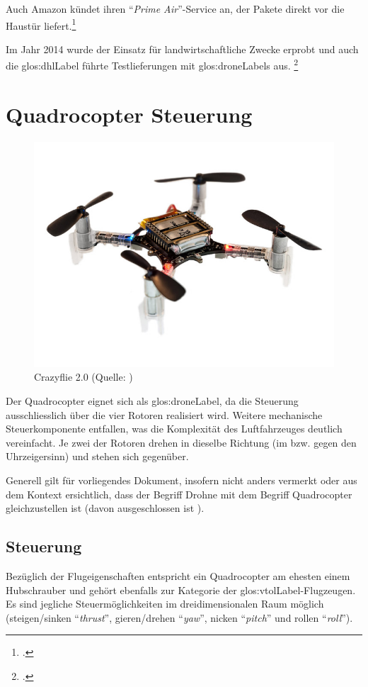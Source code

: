 Auch Amazon kündet ihren "`\textit{Prime Air}"'-Service an, der Pakete direkt vor die Haustür liefert.\footcite{Amazon_Prime_Air_2015-08-28}

Im Jahr 2014 wurde der Einsatz für landwirtschaftliche Zwecke erprobt und auch die \gls{glos:dhlLabel} führte Testlieferungen mit \glspl{glos:droneLabel} aus. \footcite{Kleine_Geschichte_der_Drohnen_-_Nachrichten_Print_-_WELT_KOMPAKT_-_Lifestyle_-_DIE_WELT_2015-03-21}


\section{Quadrocopter Steuerung}
\begin{figure}
	\includegraphics[width=1.0\linewidth]{images/analysis/crazyflize.jpg}
	\caption[Crazyflie 2.0]{Crazyflie 2.0 (Quelle: )}
\end{figure}
Der Quadrocopter eignet sich als \gls{glos:droneLabel}, da die Steuerung ausschliesslich über die vier Rotoren realisiert wird.
Weitere mechanische Steuerkomponente entfallen, was die Komplexität des Luftfahrzeuges deutlich vereinfacht.
Je zwei der Rotoren drehen in dieselbe Richtung (im bzw. gegen den Uhrzeigersinn) und stehen sich gegenüber.

Generell gilt für vorliegendes Dokument, insofern nicht anders vermerkt oder aus dem Kontext ersichtlich, dass der Begriff Drohne mit dem Begriff Quadrocopter gleichzustellen ist (davon ausgeschlossen ist ).

\subsection{Steuerung}
Bezüglich der Flugeigenschaften entspricht ein Quadrocopter am ehesten einem Hubschrauber und gehört ebenfalls zur Kategorie der  \gls{glos:vtolLabel}-Flugzeugen.
Es sind jegliche Steuermöglichkeiten im dreidimensionalen Raum möglich (steigen/sinken "`\textit{thrust}"', gieren/drehen "`\textit{yaw}"', nicken "`\textit{pitch}"' und rollen "`\textit{roll}"').

